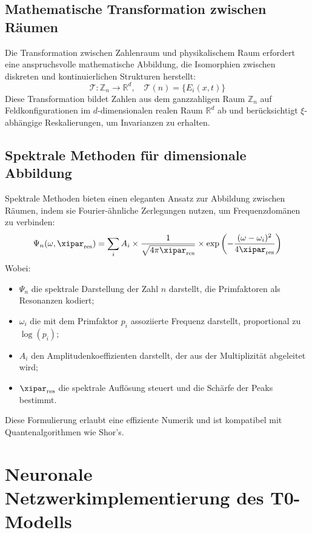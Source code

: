 \subsection{Mathematische Transformation zwischen Räumen}
\label{subsec:mathematical_transformation}
Die Transformation zwischen Zahlenraum und physikalischem Raum erfordert eine anspruchsvolle mathematische Abbildung, die Isomorphien zwischen diskreten und kontinuierlichen Strukturen herstellt:
\begin{equation}
	\mathcal{T}: \mathbb{Z}_n \to \mathbb{R}^d, \quad \mathcal{T}(n) = \{E_i(x,t)\}
\end{equation}
Diese Transformation bildet Zahlen aus dem ganzzahligen Raum $\mathbb{Z}_n$ auf Feldkonfigurationen im $d$-dimensionalen realen Raum $\mathbb{R}^d$ ab und berücksichtigt $\xi$-abhängige Reskalierungen, um Invarianzen zu erhalten.
\subsection{Spektrale Methoden für dimensionale Abbildung}
\label{subsec:spectral_methods}
Spektrale Methoden bieten einen eleganten Ansatz zur Abbildung zwischen Räumen, indem sie Fourier-ähnliche Zerlegungen nutzen, um Frequenzdomänen zu verbinden:
\begin{equation}
	\Psi_n(\omega, \xipar_{\text{res}}) = \sum_i A_i \times \frac{1}{\sqrt{4\pi\xipar_{\text{res}}}} \times \exp\left(-\frac{(\omega-\omega_i)^2}{4\xipar_{\text{res}}}\right)
\end{equation}
Wobei:
\begin{itemize}
	\item $\Psi_n$ die spektrale Darstellung der Zahl $n$ darstellt, die Primfaktoren als Resonanzen kodiert;
	\item $\omega_i$ die mit dem Primfaktor $p_i$ assoziierte Frequenz darstellt, proportional zu $\log(p_i)$;
	\item $A_i$ den Amplitudenkoeffizienten darstellt, der aus der Multiplizität abgeleitet wird;
	\item $\xipar_{\text{res}}$ die spektrale Auflösung steuert und die Schärfe der Peaks bestimmt.
\end{itemize}
Diese Formulierung erlaubt eine effiziente Numerik und ist kompatibel mit Quantenalgorithmen wie Shor's.
\section{Neuronale Netzwerkimplementierung des T0-Modells}
\label{sec:neural_network}
